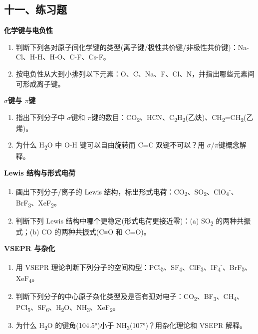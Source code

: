 \documentclass[a4paper,11pt]{ctexart}
\newcommand{\箭}{\ensuremath{\rightarrow}}
\newcommand{\左箭}{\ensuremath{\leftarrow}}
\newcommand{\上箭}{\ensuremath{\uparrow}}
\newcommand{\下箭}{\ensuremath{\downarrow}}
\newcommand{\衡}{\ensuremath{\rightleftharpoons}}
\newcommand{\双箭}{\ensuremath{\leftrightarrow}}
\newcommand{\约等于}{\ensuremath{\approx}}
\newcommand{\小于等于}{\ensuremath{\leq}}
\newcommand{\大于等于}{\ensuremath{\geq}}
\newcommand{\不等于}{\ensuremath{\neq}}
\newcommand{\西格马}{\ensuremath{\sigma}}
\newcommand{\派}{\ensuremath{\pi}}
\begin{document}
\subsection{十一、练习题}\label{ux5341ux4e00ux7ec3ux4e60ux9898}

\textbf{化学键与电负性}

\begin{enumerate}
\def\labelenumi{\arabic{enumi}.}
\item
  判断下列各对原子间化学键的类型(离子键/极性共价键/非极性共价键)：Na-Cl、H-H、H-O、C-F、Cs-F。
\item
  按电负性从大到小排列以下元素：O、C、Na、F、Cl、N，并指出哪些元素间可形成离子键。
\end{enumerate}

\textbf{\西格马 键与 \派 键}

\begin{enumerate}
\def\labelenumi{\arabic{enumi}.}
\setcounter{enumi}{2}
\item
  指出下列分子中 \西格马 键和 \派 键的数目：CO\textsubscript{2}、HCN、C\textsubscript{2}H\textsubscript{2}(乙炔)、CH\textsubscript{2}=CH\textsubscript{2}(乙烯)。
\item
  为什么 H\textsubscript{2}O 中 O-H 键可以自由旋转而 C=C 双键不可以？用 \西格马/\派 键概念解释。
\end{enumerate}

\textbf{Lewis 结构与形式电荷}

\begin{enumerate}
\def\labelenumi{\arabic{enumi}.}
\setcounter{enumi}{4}
\item
  画出下列分子/离子的 Lewis 结构，标出形式电荷：CO\textsubscript{2}、SO\textsubscript{2}、ClO\textsubscript{4}\textsuperscript{-}、BrF\textsubscript{3}、XeF\textsubscript{2}。
\item
  判断下列 Lewis 结构中哪个更稳定(形式电荷更接近零)：(a) SO\textsubscript{2} 的两种共振式；(b) CO 的两种共振式(C≡O 和 C=O)。
\end{enumerate}

\textbf{VSEPR 与杂化}

\begin{enumerate}
\def\labelenumi{\arabic{enumi}.}
\setcounter{enumi}{6}
\item
  用 VSEPR 理论判断下列分子的空间构型：PCl\textsubscript{5}、SF\textsubscript{4}、ClF\textsubscript{3}、IF\textsubscript{4}\textsuperscript{-}、BrF\textsubscript{5}、XeF\textsubscript{4}。
\item
  判断下列分子的中心原子杂化类型及是否有孤对电子：CO\textsubscript{2}、BF\textsubscript{3}、CH\textsubscript{4}、PCl\textsubscript{5}、SF\textsubscript{6}、H\textsubscript{2}O、NH\textsubscript{3}、XeF\textsubscript{2}。
\item
  为什么 H\textsubscript{2}O 的键角(104.5°)小于 NH\textsubscript{3}(107°)？用杂化理论和 VSEPR 解释。
\end{enumerate}
\end{document}
